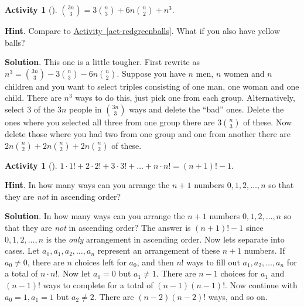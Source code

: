 \documentclass[10pt,]{book}
\theoremstyle{plain}
\theoremstyle{definition}
\theoremstyle{definition}
\theoremstyle{definition}
\newtheorem{activity}[project]{Activity}
\theoremstyle{definition}
\numberwithin{equation}{chapter}
\begin{document}
\begin{activity}[]\label{activity-47}
\hypertarget{p-627}{}%
\(\binom{3n}{3} = 3 \binom{n}{3} + 6n \binom{n}{2} + n^{3}\).%
\par\smallskip%
\noindent\textbf{Hint}.\hypertarget{hint-35}{}\quad%
\hypertarget{p-628}{}%
Compare to \hyperref[act-redgreenballs]{Activity~\ref{act-redgreenballs}}.  What if you also have yellow balls?%
\par\smallskip%
\noindent\textbf{Solution}.\hypertarget{solution-55}{}\quad%
\hypertarget{p-629}{}%
This one is a little tougher. First rewrite as \(n^{3} = \binom{3n}{3} - 3 \binom{n}{3} - 6n \binom{n}{2}\). Suppose you have \(n\) men, \(n\) women and \(n\) children and you want to select triples consisting of one man, one woman and one child. There are \(n^{3}\) ways to do this, just pick one from each group. Alternatively, select 3 of the \(3n\) people in \(\binom{3n}{3}\) ways and delete the ``bad'' ones. Delete the ones where you selected all three from one group \textemdash{} there are \(3 \binom{n}{3}\) of these. Now delete those where you had two from one group and one from another \textemdash{} there are \(2n \binom{n}{2} + 2n \binom{n}{2} + 2n \binom{n}{2}\) of these.%
\end{activity}
\begin{activity}[]\label{activity-48}
\hypertarget{p-630}{}%
\(1 \cdot 1! + 2 \cdot 2! + 3 \cdot 3! + \ldots + n \cdot n! = \left( n + 1 \right)! - 1\).%
\par\smallskip%
\noindent\textbf{Hint}.\hypertarget{hint-36}{}\quad%
\hypertarget{p-631}{}%
In how many ways can you arrange the \(n+1\) numbers \(0, 1, 2, \ldots, n\) so that they are \emph{not} in ascending order?%
\par\smallskip%
\noindent\textbf{Solution}.\hypertarget{solution-56}{}\quad%
\hypertarget{p-632}{}%
In how many ways can you arrange the \(n+1\) numbers \(0, 1, 2, \ldots, n\) so that they are \emph{not} in ascending order? The answer is \(\left( n + 1 \right)! - 1\) since \(0, 1, 2, \ldots, n\) is the \emph{only} arrangement in ascending order. Now lets separate into cases. Let \(a_{0},a_{1},a_{2},\ldots,a_{n}\) represent an arrangement of these \(n+1\) numbers. If \(a_{0} \neq 0\), there are \(n\) choices left for \(a_{0}\), and then \(n!\) ways to fill out \(a_{1},a_{2},\ldots,a_{n}\) for a total of \(n \cdot n!\). Now let \(a_{0} = 0\) but \(a_{1} \neq 1\). There are \(n - 1\) choices for \(a_{1}\) and \(\left(n - 1 \right)!\) ways to complete for a total of \(\left(n - 1 \right)\left(n - 1 \right)!\). Now continue with \(a_{0} = 1,a_{1} = 1\) but \(a_{2} \neq 2\). There are \(\left(n - 2 \right)\left(n - 2 \right)!\) ways, and so on.%
\end{activity}
\end{document}
